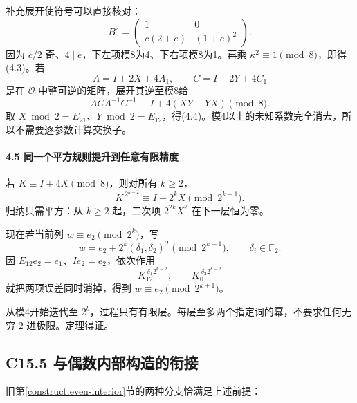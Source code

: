 {补充展开使符号可以直接核对：} \[
B^2=\begin{pmatrix}1&0\\c(2+e)&(1+e)^2\end{pmatrix}.
\] {因为} \(c/2\) {奇、}\(4\mid e\){，下左项模8为4、下右项模8为1。再乘} \(\kappa^2\equiv1\pmod8\){，即得(4.3)。若} \[
A=I+2X+4A_1,\qquad C=I+2Y+4C_1
\] {是在} \(\mathcal O\) {中整可逆的矩阵，展开其逆至模8给} \[
ACA^{-1}C^{-1}\equiv I+4(XY-YX)\pmod8.
\] {取} \(X\bmod2=E_{21}\){、}\(Y\bmod2=E_{12}\){，得(4.4)。模4以上的未知系数完全消去，所以不需要逐参数计算交换子。}

\paragraph*{\texorpdfstring{{4.5} {同一个平方规则提升到任意有限精度}}{4.5 同一个平方规则提升到任意有限精度}}\label{C15-h112}

{若} \(K\equiv I+4X\pmod8\){，则对所有} \(k\ge2\){，} \[
K^{\,2^{k-2}}\equiv I+2^kX\pmod{2^{k+1}}.
\tag{C15.4.5}
\] {归纳只需平方：从} \(k\ge2\) {起，二次项} \(2^{2k}X^2\) {在下一层恒为零。}

{现在若当前列} \(w\equiv e_2\pmod{2^k}\){，写} \[
w=e_2+2^k(\delta_1,\delta_2)^T
             \pmod{2^{k+1}},\qquad \delta_i\in\mathbb F_2.
\] {因} \(E_{12}e_2=e_1\){、}\(Ie_2=e_2\){，依次作用} \[
K_{12}^{\,\delta_1 2^{k-2}},\qquad
K_0^{\,\delta_2 2^{k-2}}
\tag{C15.4.6}
\] {就把两项误差同时消掉，得到} \(w\equiv e_2\pmod{2^{k+1}}\){。}

{从模4开始迭代至} \(2^b\){，过程只有有限层。每层至多两个指定词的幂，不要求任何无穷} \(2\) {进极限。定理得证。}

\subsection*{\texorpdfstring{{C15.5} {与偶数内部构造的衔接}}{C15.5 与偶数内部构造的衔接}}\label{C15-h113}

{旧}第\ref{construct:even-interior}节{的两种分支恰满足上述前提：}


